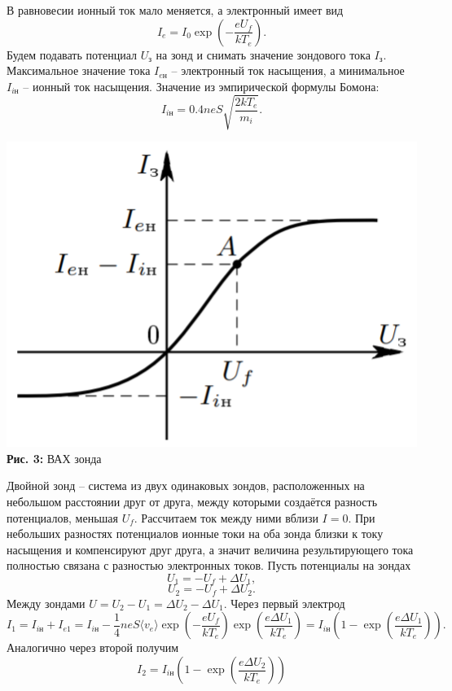 \documentclass[12pt,a4paper]{scrartcl}
\begin{document}
В равновесии ионный ток мало меняется, а электронный имеет вид
$$
I_e = I_0 \exp\left( -\dfrac{eU_f}{kT_e} \right).
$$
Будем подавать потенциал $U_\text{з}$ на зонд и снимать значение зондового тока $I_\text{з}$. Максимальное значение тока $I_{e\text{н}}$ -- электронный ток насыщения, а минимальное $I_{i\text{н}}$ -- ионный ток насыщения. Значение из эмпирической формулы Бомона:
\begin{equation}
I_{i\text{н}} = 0.4 neS \sqrt{\dfrac{2kT_e}{m_i}}.
\end{equation}	

\begin{center}
\includegraphics[scale=0.5]{PIC_3.png}
\\\textbf{Рис. 3:} ВАХ зонда
\end{center} 
	
Двойной зонд -- система из двух одинаковых зондов, расположенных на небольшом расстоянии друг от друга, между которыми создаётся разность потенциалов, меньшая $U_f$. Рассчитаем ток между ними вблизи $I=0$. При небольших разностях потенциалов ионные токи на оба зонда близки к току насыщения и компенсируют друг друга, а значит величина результирующего тока полностью связана с разностью электронных токов. Пусть потенциалы на зондах
$$
U_1 = -U_f + \Delta U_1,
$$
$$
U_2 = -U_f + \Delta U_2.
$$
Между зондами $U = U_2 - U_1 = \Delta U_2 - \Delta U_1$.
Через первый электрод
\begin{equation}
I_1 = I_{i\text{н}} + I_{e1} = I_{i\text{н}} - \dfrac{1}{4}neS\langle v_e\rangle \exp\left(-\dfrac{eU_f}{kT_e}\right)\exp\left(\dfrac{e\Delta U_1}{kT_e}\right)=I_{i\text{н}}\left(1 - \exp\left( \dfrac{e\Delta U_1}{kT_e} \right)\right).
\end{equation}
Аналогично через второй получим
\begin{equation}
I_2 = I_{i\text{н}}\left(1 - \exp\left( \dfrac{e\Delta U_2}{kT_e} \right)\right)
\end{equation}
	
\end{document}
